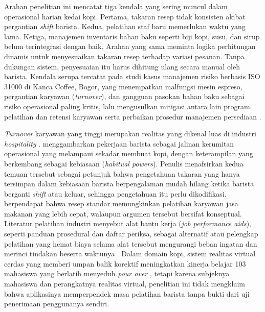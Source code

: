 Arahan penelitian ini mencatat tiga kendala yang sering muncul dalam operasional harian kedai kopi. Pertama, takaran resep tidak konsisten akibat pergantian \textit{shift} barista. Kedua, pelatihan staf baru memerlukan waktu yang lama. Ketiga, manajemen inventaris bahan baku seperti biji kopi, susu, dan sirup belum terintegrasi dengan baik. Arahan yang sama meminta logika perhitungan dinamis untuk menyesuaikan takaran resep terhadap variasi pesanan. Tanpa dukungan sistem, penyesuaian itu harus dihitung ulang secara manual oleh barista. Kendala serupa tercatat pada studi kasus manajemen risiko berbasis ISO 31000 di Kanca Coffee, Bogor, yang menempatkan malfungsi mesin espreso, pergantian karyawan (\textit{turnover}), dan gangguan pasokan bahan baku sebagai risiko operasional paling kritis, lalu mengusulkan mitigasi antara lain program pelatihan dan retensi karyawan serta perbaikan prosedur manajemen persediaan \citep*{akbar2026operational}.

\textit{Turnover} karyawan yang tinggi merupakan realitas yang dikenal luas di industri \textit{hospitality} \citep*{dogru2023employee}. \citet*{lee2022barista} menggambarkan pekerjaan barista sebagai jalinan kerumitan operasional yang melampaui sekadar membuat kopi, dengan keterampilan yang berkembang sebagai kebiasaan (\textit{habitual powers}). Penulis menafsirkan kedua temuan tersebut sebagai petunjuk bahwa pengetahuan takaran yang hanya tersimpan dalam kebiasaan barista berpengalaman mudah hilang ketika barista berganti \textit{shift} atau keluar, sehingga pengetahuan itu perlu dikodifikasi. \citet*{naumov2023employment} berpendapat bahwa resep standar memungkinkan pelatihan karyawan jasa makanan yang lebih cepat, walaupun argumen tersebut bersifat konseptual. Literatur pelatihan industri menyebut alat bantu kerja (\textit{job performance aids}), seperti panduan prosedural dan daftar periksa, sebagai alternatif atau pelengkap pelatihan yang hemat biaya selama alat tersebut mengurangi beban ingatan dan merinci tindakan beserta waktunya \citep*{campbell1996job}. Dalam domain kopi, sistem realitas virtual cerdas yang memberi umpan balik korektif meningkatkan kinerja belajar 103 mahasiswa yang berlatih menyeduh \textit{pour over} \citep*{yu2021developing}, tetapi karena subjeknya mahasiswa dan perangkatnya realitas virtual, penelitian ini tidak mengklaim bahwa aplikasinya memperpendek masa pelatihan barista tanpa bukti dari uji penerimaan penggunanya sendiri.

